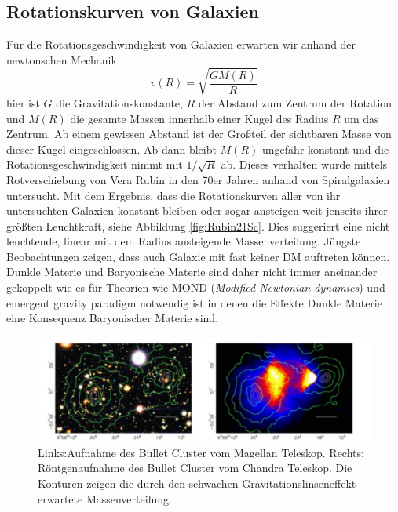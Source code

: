 \subsection*{Rotationskurven von Galaxien}
Für die Rotationsgeschwindigkeit von Galaxien erwarten wir anhand der newtonschen Mechanik
\begin{equation}
v(R) = \sqrt{\frac{GM(R)}{R}}
\label{eq:Keppler}
\end{equation}
hier ist $G$ die Gravitationskonstante, $R$ der Abstand zum Zentrum der Rotation und $M(R)$ die gesamte Massen innerhalb einer Kugel des Radius $R$ um das Zentrum.  
Ab einem gewissen Abstand ist der Großteil der sichtbaren Masse von dieser Kugel eingeschlossen.
Ab dann bleibt $M(R)$ ungefähr konstant und die Rotationsgeschwindigkeit nimmt mit $1/\sqrt{R}$ ab.
Dieses verhalten wurde mittels Rotverschiebung von Vera Rubin in den 70er Jahren anhand von Spiralgalaxien untersucht.
Mit dem Ergebnis, dass die Rotationskurven aller von ihr untersuchten Galaxien konstant bleiben oder sogar ansteigen weit jenseits ihrer größten Leuchtkraft, siehe Abbildung \ref{fig:Rubin21Sc}.
Dies suggeriert eine nicht leuchtende, linear mit dem Radius ansteigende Massenverteilung.\cite{Rubin80}
Jüngste Beobachtungen zeigen, dass auch Galaxie mit fast keiner DM auftreten können\cite{VanDokkum2018}.
Dunkle Materie und Baryonische Materie sind daher nicht immer aneinander gekoppelt wie es für Theorien wie MOND\cite{1983ApJ...270..365M} (\textit{Modified Newtonian dynamics}) und emergent gravity paradigm\cite{Verlinde2016} notwendig ist in denen die Effekte Dunkle Materie eine Konsequenz Baryonischer Materie sind.

\begin{figure}[!b]
\begin{center}
\includegraphics[width=\textwidth]{./fig/Bullet.pdf}
\end{center}
\caption{Links:Aufnahme des Bullet Cluster vom Magellan Teleskop.
Rechts: Röntgenaufnahme des Bullet Cluster vom Chandra Teleskop.
Die Konturen zeigen die durch den schwachen Gravitationslinseneffekt erwartete Massenverteilung.\cite{Clowe2006}}
\label{fig:BulletC}
\end{figure}

